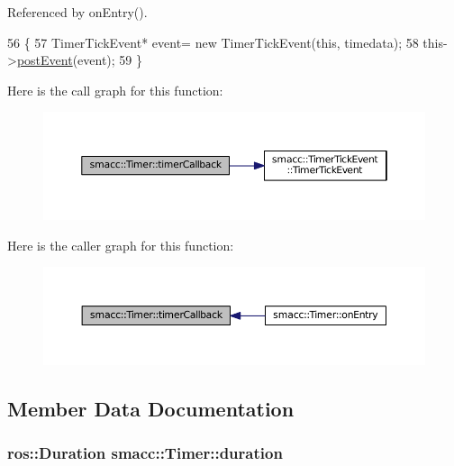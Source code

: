 Referenced by on\+Entry().


\begin{DoxyCode}
56   \{
57     TimerTickEvent* \textcolor{keyword}{event}= \textcolor{keyword}{new} TimerTickEvent(\textcolor{keyword}{this}, timedata);
58     this->\hyperlink{classsmacc_1_1SmaccClientBehavior_ab29b23145ea074ad69340fc0af6fbb75}{postEvent}(event);
59   \}   
\end{DoxyCode}


Here is the call graph for this function\+:
\nopagebreak
\begin{figure}[H]
\begin{center}
\leavevmode
\includegraphics[width=350pt]{classsmacc_1_1Timer_a3939cbeb19e5a7d9c02c56064805b242_cgraph}
\end{center}
\end{figure}




Here is the caller graph for this function\+:
\nopagebreak
\begin{figure}[H]
\begin{center}
\leavevmode
\includegraphics[width=350pt]{classsmacc_1_1Timer_a3939cbeb19e5a7d9c02c56064805b242_icgraph}
\end{center}
\end{figure}




\subsection{Member Data Documentation}
\subsubsection[{\texorpdfstring{duration}{duration}}]{\setlength{\rightskip}{0pt plus 5cm}ros\+::\+Duration smacc\+::\+Timer\+::duration}\hypertarget{classsmacc_1_1Timer_a564c0bbd2b12909d61a1345358c641fc}{}\label{classsmacc_1_1Timer_a564c0bbd2b12909d61a1345358c641fc}


